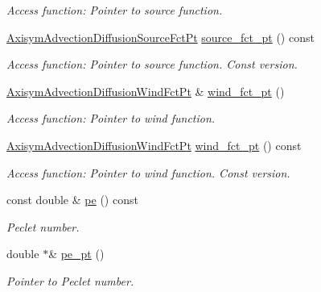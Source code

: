 \begin{DoxyCompactItemize}
\begin{DoxyCompactList}\small\item\em Access function\+: Pointer to source function. \end{DoxyCompactList}\item 
\hyperlink{classoomph_1_1AxisymAdvectionDiffusionEquations_a5110527308cbe58e90fb9ac146d172a0}{Axisym\+Advection\+Diffusion\+Source\+Fct\+Pt} \hyperlink{classoomph_1_1AxisymAdvectionDiffusionEquations_a17c388ee58d922f5dc26e8d315aead58}{source\+\_\+fct\+\_\+pt} () const
\begin{DoxyCompactList}\small\item\em Access function\+: Pointer to source function. Const version. \end{DoxyCompactList}\item 
\hyperlink{classoomph_1_1AxisymAdvectionDiffusionEquations_a53ee8d4a13b53896d66020591a8224b0}{Axisym\+Advection\+Diffusion\+Wind\+Fct\+Pt} \& \hyperlink{classoomph_1_1AxisymAdvectionDiffusionEquations_a961d34684ce6d565ad387b41b2bd92de}{wind\+\_\+fct\+\_\+pt} ()
\begin{DoxyCompactList}\small\item\em Access function\+: Pointer to wind function. \end{DoxyCompactList}\item 
\hyperlink{classoomph_1_1AxisymAdvectionDiffusionEquations_a53ee8d4a13b53896d66020591a8224b0}{Axisym\+Advection\+Diffusion\+Wind\+Fct\+Pt} \hyperlink{classoomph_1_1AxisymAdvectionDiffusionEquations_ab3b0dcb5dd4d30914b34c4628fe45288}{wind\+\_\+fct\+\_\+pt} () const
\begin{DoxyCompactList}\small\item\em Access function\+: Pointer to wind function. Const version. \end{DoxyCompactList}\item 
const double \& \hyperlink{classoomph_1_1AxisymAdvectionDiffusionEquations_a5fe8ad73aa3e51e071b61aa928f4d49a}{pe} () const
\begin{DoxyCompactList}\small\item\em Peclet number. \end{DoxyCompactList}\item 
double $\ast$\& \hyperlink{classoomph_1_1AxisymAdvectionDiffusionEquations_af993c9e10b06b7f909569db2e9f9459f}{pe\+\_\+pt} ()
\begin{DoxyCompactList}\small\item\em Pointer to Peclet number. \end{DoxyCompactList}\item 

\end{DoxyCompactItemize}
